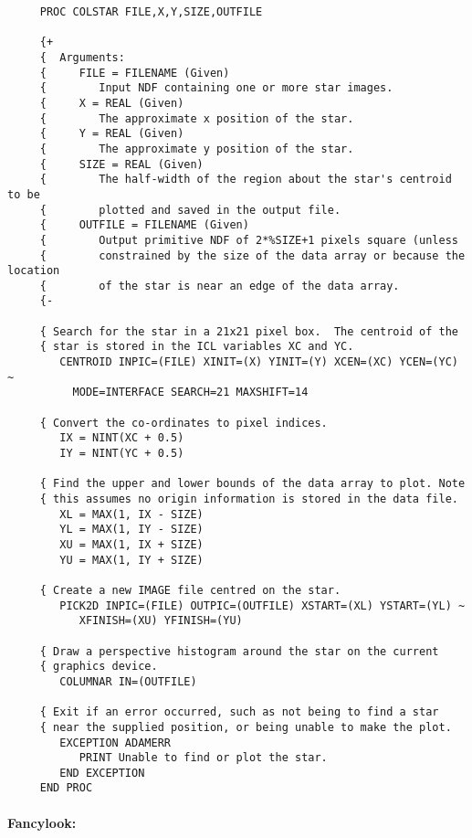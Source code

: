 \begin{small}
\begin{verbatim}
     PROC COLSTAR FILE,X,Y,SIZE,OUTFILE

     {+
     {  Arguments:
     {     FILE = FILENAME (Given)
     {        Input NDF containing one or more star images.
     {     X = REAL (Given)
     {        The approximate x position of the star.
     {     Y = REAL (Given)
     {        The approximate y position of the star.
     {     SIZE = REAL (Given)
     {        The half-width of the region about the star's centroid to be
     {        plotted and saved in the output file.
     {     OUTFILE = FILENAME (Given)
     {        Output primitive NDF of 2*%SIZE+1 pixels square (unless
     {        constrained by the size of the data array or because the location
     {        of the star is near an edge of the data array.
     {-

     { Search for the star in a 21x21 pixel box.  The centroid of the
     { star is stored in the ICL variables XC and YC.
        CENTROID INPIC=(FILE) XINIT=(X) YINIT=(Y) XCEN=(XC) YCEN=(YC) ~
          MODE=INTERFACE SEARCH=21 MAXSHIFT=14

     { Convert the co-ordinates to pixel indices.
        IX = NINT(XC + 0.5)
        IY = NINT(YC + 0.5)

     { Find the upper and lower bounds of the data array to plot. Note
     { this assumes no origin information is stored in the data file.
        XL = MAX(1, IX - SIZE)
        YL = MAX(1, IY - SIZE)
        XU = MAX(1, IX + SIZE)
        YU = MAX(1, IY + SIZE)

     { Create a new IMAGE file centred on the star.
        PICK2D INPIC=(FILE) OUTPIC=(OUTFILE) XSTART=(XL) YSTART=(YL) ~
           XFINISH=(XU) YFINISH=(YU)

     { Draw a perspective histogram around the star on the current
     { graphics device.
        COLUMNAR IN=(OUTFILE)

     { Exit if an error occurred, such as not being to find a star
     { near the supplied position, or being unable to make the plot.
        EXCEPTION ADAMERR
           PRINT Unable to find or plot the star.
        END EXCEPTION
     END PROC
\end{verbatim}
\end{small}

\paragraph{Fancylook:}\hfill

